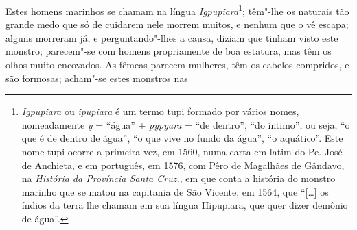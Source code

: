 Estes homens marinhos se chamam na língua \textit{Igpupiara}\footnote{ \textit{Igpupiara} 
ou \textit{ipupiara} é um termo tupi
formado por vários nomes, nomeadamente \textit{y} = ``água'' +
\textit{pypyara} = ``de dentro'', ``do íntimo'', ou seja, ``o que é de
dentro de água'', ``o que vive no fundo da água'', ``o aquático''. Este
nome tupi ocorre a primeira vez, em 1560, numa carta em latim do Pe.
José de Anchieta, e em português, em 1576, com Pêro de Magalhães de Gândavo,
na \textit{História da Província Santa Cruz.}, em que conta a
história do monstro marinho que se matou na capitania de São Vicente,
em 1564, que ``[\ldots{}] os índios da terra lhe chamam em sua língua
Hipupiara, que quer dizer demônio de água''.}; têm"-lhe os naturais tão
grande medo que só de cuidarem nele morrem muitos, e nenhum que o vê
escapa; alguns morreram já, e perguntando"-lhes a causa, diziam que
tinham visto este monstro; parecem"-se com homens propriamente de boa
estatura, mas têm os olhos muito encovados. As fêmeas parecem mulheres,
têm os cabelos compridos, e são formosas; acham"-se estes monstros nas

